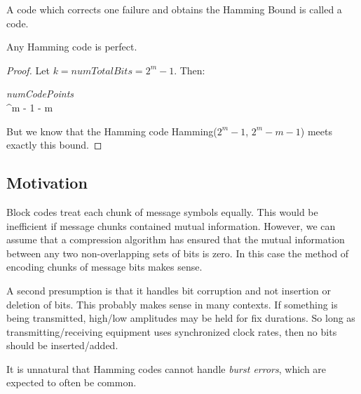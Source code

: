 \documentclass[11pt, oneside]{amsart}
\begin{document}
\begin{definition}
  A code which corrects one failure and obtains the Hamming Bound is
  called a  code.
\end{definition}

\begin{corollary}
  Any Hamming code is perfect.
\end{corollary}

\begin{proof}
  Let $k = \textit{numTotalBits} = 2^m - 1$. Then:

  \begin{nedqn}
    \textit{numCodePoints}
  \leqcol
  \\
  ^m - 1 - m
  \end{nedqn}

  But we know that the Hamming code Hamming($2^m - 1$, $2^m - m - 1$)
  meets exactly this bound.
\end{proof}

\subsection{Motivation}

Block codes treat each chunk of message symbols equally. This would be
inefficient if message chunks contained mutual information. However, we
can assume that a compression algorithm has ensured that the mutual
information between any two non-overlapping sets of bits is zero. In
this case the method of encoding chunks of message bits makes sense.

A second presumption is that it handles bit corruption and not insertion
or deletion of bits. This probably makes sense in many contexts. If
something is being transmitted, high/low amplitudes may be held for fix
durations. So long as transmitting/receiving equipment uses synchronized
clock rates, then no bits should be inserted/added.

It is unnatural that Hamming codes cannot handle \emph{burst errors},
which are expected to often be common.




\end{document}
